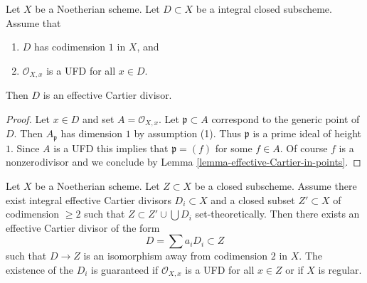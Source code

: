\begin{lemma}
\label{lemma-weil-divisor-is-cartier-UFD}
Let $X$ be a Noetherian scheme. Let $D \subset X$ be a integral
closed subscheme. Assume that
\begin{enumerate}
\item $D$ has codimension $1$ in $X$, and
\item $\mathcal{O}_{X, x}$ is a UFD for all $x \in D$.
\end{enumerate}
Then $D$ is an effective Cartier divisor.
\end{lemma}

\begin{proof}
Let $x \in D$ and set $A = \mathcal{O}_{X, x}$. Let $\mathfrak p \subset A$
correspond to the generic point of $D$. Then $A_\mathfrak p$ has dimension
$1$ by assumption (1). Thus $\mathfrak p$ is a prime ideal of height $1$.
Since $A$ is a UFD this implies that $\mathfrak p = (f)$ for some $f \in A$.
Of course $f$ is a nonzerodivisor and we conclude by
Lemma \ref{lemma-effective-Cartier-in-points}.
\end{proof}

\begin{lemma}
\label{lemma-codim-1-part}
Let $X$ be a Noetherian scheme. Let $Z \subset X$ be a closed subscheme.
Assume there exist integral effective Cartier divisors $D_i \subset X$
and a closed subset $Z' \subset X$ of codimension $\geq 2$ such that
$Z \subset Z' \cup \bigcup D_i$ set-theoretically.
Then there exists an effective Cartier divisor of the form
$$
D = \sum a_i D_i \subset Z
$$
such that $D \to Z$ is an isomorphism away from codimension $2$ in $X$.
The existence of the $D_i$ is guaranteed if $\mathcal{O}_{X, x}$
is a UFD for all $x \in Z$ or if $X$ is regular.
\end{lemma}

